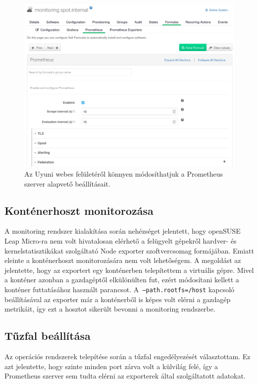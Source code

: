 \begin{figure}[ht]
	\centering
	\includegraphics[width=15cm]{figures/prometheus-formula.png}
	\caption{Az Uyuni webes felületéről könnyen módosíthatjuk a Prometheus szerver alapvető beállításait.}
	\label{fig:prometheus-formula}
\end{figure}

\subsection{Konténerhoszt monitorozása}
A monitoring rendszer kialakítása során nehézséget jelentett, hogy openSUSE Leap Micro-ra nem volt hivatalosan elérhető a felügyelt gépekről hardver- és kernelstatisztikákat szolgáltató Node exporter szoftvercsomag formájában. Emiatt eleinte a konténerhoszt monitorozására nem volt lehetőségem. A megoldást az jelentette, hogy az exportert egy konténerben telepítettem a virtuális gépre. Mivel a konténer azonban a gazdagéptől elkülönülten fut, ezért módosítani kellett a konténer futtatásához használt parancsot. A~\texttt{--path.rootfs=/host} kapcsoló beállításával az exporter már a konténerből is képes volt elérni a gazdagép metrikáit, így ezt a hosztot sikerült bevonni a monitoring rendszerbe.

\subsection{Tűzfal beállítása}
Az operációs rendszerek telepítése során a tűzfal engedélyezését választottam. Ez azt jelentette, hogy szinte minden port zárva volt a külvilág felé, így a Prometheus szerver sem tudta elérni az exporterek által szolgáltatott adatokat.

